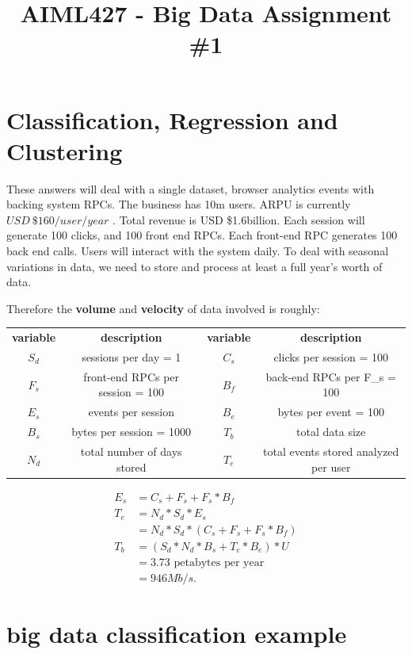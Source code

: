 \documentclass[11pt]{article}
\begin{document}
\title{AIML427 - Big Data Assignment \#1}
\section{Classification, Regression and Clustering}

These answers will deal with a single dataset, browser analytics events with backing system RPCs. The business has 10m users. ARPU is currently \(USD\ \$160/user/year\) \cite{arpu}. Total revenue is USD \$1.6billion. Each session will generate 100 clicks, and 100 front end RPCs. Each front-end RPC generates 100 back end calls. Users will interact with the system daily. To deal with seasonal variations in data, we need to store and process at least a full year's worth of data. 

Therefore the \textbf{volume} and \textbf{velocity} of data involved is roughly:

\begin{center}
	\begin{tabular}{|c c | c c|}
	\hline
	    \textbf{variable} & \textbf{description} & \textbf{variable} & \textbf{description}\\
	    \(S_d\) & sessions per day = 1 & \(C_s\) & clicks per session = 100\\
	    \(F_s\) & front-end RPCs per session = 100 & \(B_f\) & back-end RPCs per F\_s = 100\\
	    \(E_s\) & events per session & \(B_e\) & bytes per event = 100\\
	    \(B_s\) & bytes per session = 1000 & \(T_b\) & total data size\\
	    \(N_d\) & total number of days stored & \(T_e\) & total events stored analyzed per user\\
	\hline
	\end{tabular}
\end{center}

\begin{align*}
	E_s &= C_s + F_s + F_s * B_f\\
	T_e &= N_d * S_d * E_s\\
	&= N_d * S_d * (C_s + F_s + F_s * B_f)\\
	T_b &= (S_d * N_d * B_s + T_e * B_e) * U\\
	&= 3.73 \text{ petabytes per year}\\
	&= 946Mb/s.
\end{align*}

\section*{big data classification example}
\end{document}
